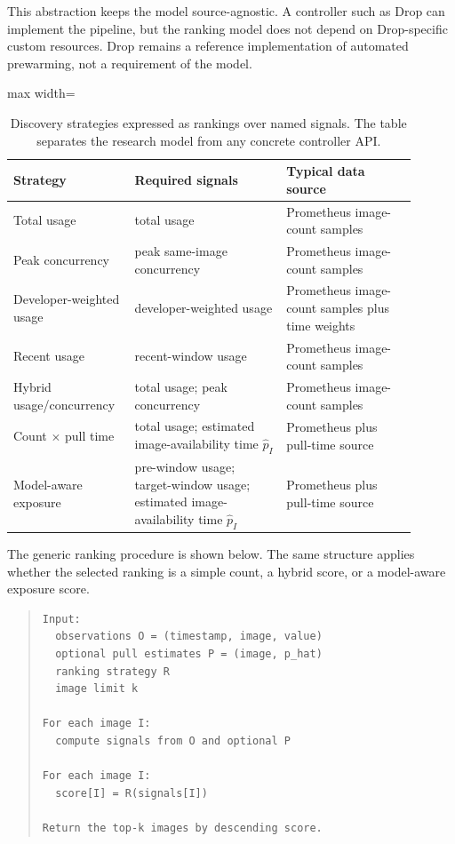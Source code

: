 \documentclass[11pt,a4paper]{article}
\begin{document}
This abstraction keeps the model source-agnostic. A controller such as Drop can implement the pipeline, but the ranking model does not depend on Drop-specific custom resources. Drop remains a reference implementation of automated prewarming, not a requirement of the model.

\begin{table}[H]
\centering
\caption{Discovery strategies expressed as rankings over named signals. The table separates the research model from any concrete controller API.}
\label{tab:strategy-signal-map}
\scriptsize
\begin{adjustbox}{max width=\linewidth}
\begin{tabular}{p{0.25\linewidth}p{0.35\linewidth}p{0.30\linewidth}}
\toprule
Strategy & Required signals & Typical data source \\
\midrule
Total usage & total usage & Prometheus image-count samples \\
Peak concurrency & peak same-image concurrency & Prometheus image-count samples \\
Developer-weighted usage & developer-weighted usage & Prometheus image-count samples plus time weights \\
Recent usage & recent-window usage & Prometheus image-count samples \\
Hybrid usage/concurrency & total usage; peak concurrency & Prometheus image-count samples \\
Count $\times$ pull time & total usage; estimated image-availability time $\hat{p}_I$ & Prometheus plus pull-time source \\
Model-aware exposure & pre-window usage; target-window usage; estimated image-availability time $\hat{p}_I$ & Prometheus plus pull-time source \\
\bottomrule
\end{tabular}
\end{adjustbox}
\end{table}

The generic ranking procedure is shown below. The same structure applies whether the selected ranking is a simple count, a hybrid score, or a model-aware exposure score.

\begin{quote}
\small
\begin{verbatim}
Input:
  observations O = (timestamp, image, value)
  optional pull estimates P = (image, p_hat)
  ranking strategy R
  image limit k

For each image I:
  compute signals from O and optional P

For each image I:
  score[I] = R(signals[I])

Return the top-k images by descending score.
\end{verbatim}
\end{quote}
\end{document}
